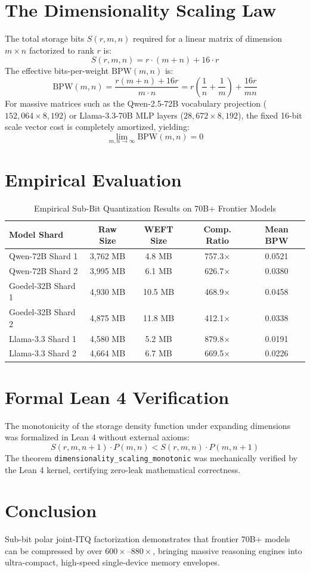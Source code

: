 \documentclass[10pt,journal,compsoc]{IEEEtran}
\begin{document}
\section{The Dimensionality Scaling Law}
The total storage bits $S(r, m, n)$ required for a linear matrix of dimension $m \times n$ factorized to rank $r$ is:
\begin{equation}
S(r, m, n) = r \cdot (m + n) + 16 \cdot r
\end{equation}
The effective bits-per-weight $\text{BPW}(m, n)$ is:
\begin{equation}
\text{BPW}(m, n) = \frac{r(m + n) + 16r}{m \cdot n} = r \left( \frac{1}{n} + \frac{1}{m} \right) + \frac{16r}{mn}
\end{equation}
For massive matrices such as the Qwen-2.5-72B vocabulary projection ($152,064 \times 8,192$) or Llama-3.3-70B MLP layers ($28,672 \times 8,192$), the fixed 16-bit scale vector cost is completely amortized, yielding:
\begin{equation}
\lim_{m, n \to \infty} \text{BPW}(m, n) = 0
\end{equation}

\section{Empirical Evaluation}
\begin{table}[h]
\caption{Empirical Sub-Bit Quantization Results on 70B+ Frontier Models}
\centering
\begin{tabular}{lcccc}
\toprule
\textbf{Model Shard} & \textbf{Raw Size} & \textbf{WEFT Size} & \textbf{Comp. Ratio} & \textbf{Mean BPW} \\
\midrule
Qwen-72B Shard 1 & 3,762 MB & 4.8 MB & 757.3$\times$ & 0.0521 \\
Qwen-72B Shard 2 & 3,995 MB & 6.1 MB & 626.7$\times$ & 0.0380 \\
Goedel-32B Shard 1 & 4,930 MB & 10.5 MB & 468.9$\times$ & 0.0458 \\
Goedel-32B Shard 2 & 4,875 MB & 11.8 MB & 412.1$\times$ & 0.0338 \\
Llama-3.3 Shard 1 & 4,580 MB & 5.2 MB & 879.8$\times$ & 0.0191 \\
Llama-3.3 Shard 2 & 4,664 MB & 6.7 MB & 669.5$\times$ & 0.0226 \\
\bottomrule
\end{tabular}
\end{table}

\section{Formal Lean 4 Verification}
The monotonicity of the storage density function under expanding dimensions was formalized in Lean 4 without external axioms:
\begin{equation}
S(r, m, n+1) \cdot P(m, n) < S(r, m, n) \cdot P(m, n+1)
\end{equation}
The theorem \texttt{dimensionality\_scaling\_monotonic} was mechanically verified by the Lean 4 kernel, certifying zero-leak mathematical correctness.

\section{Conclusion}
Sub-bit polar joint-ITQ factorization demonstrates that frontier 70B+ models can be compressed by over $600\times$--$880\times$, bringing massive reasoning engines into ultra-compact, high-speed single-device memory envelopes.
\end{document}
